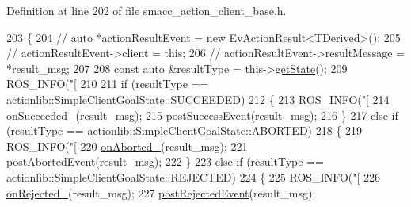 Definition at line 202 of file smacc\+\_\+action\+\_\+client\+\_\+base.\+h.


\begin{DoxyCode}
203     \{
204         \textcolor{comment}{// auto *actionResultEvent = new EvActionResult<TDerived>();}
205         \textcolor{comment}{// actionResultEvent->client = this;}
206         \textcolor{comment}{// actionResultEvent->resultMessage = *result\_msg;}
207 
208         \textcolor{keyword}{const} \textcolor{keyword}{auto} &resultType = this->\hyperlink{classsmacc_1_1client__bases_1_1SmaccActionClientBase_a97192acd7bb7cac5de0191e700ab72ee}{getState}();
209         ROS\_INFO(\textcolor{stringliteral}{"[%
210 
211         \textcolor{keywordflow}{if} (resultType == actionlib::SimpleClientGoalState::SUCCEEDED)
212         \{
213             ROS\_INFO(\textcolor{stringliteral}{"[%
214             \hyperlink{classsmacc_1_1client__bases_1_1SmaccActionClientBase_afa1d615e16c9e825d815a3a3ccaa61df}{onSucceeded\_}(result\_msg);
215             \hyperlink{classsmacc_1_1client__bases_1_1SmaccActionClientBase_afb4f82508cd653d496392f321e84a783}{postSuccessEvent}(result\_msg);
216         \}
217         \textcolor{keywordflow}{else} \textcolor{keywordflow}{if} (resultType == actionlib::SimpleClientGoalState::ABORTED)
218         \{
219             ROS\_INFO(\textcolor{stringliteral}{"[%
220             \hyperlink{classsmacc_1_1client__bases_1_1SmaccActionClientBase_adc33748ca4fcef9730f8039b75d496d0}{onAborted\_}(result\_msg);
221             \hyperlink{classsmacc_1_1client__bases_1_1SmaccActionClientBase_a9ca2952ededeec233ee6d8a9a39c680b}{postAbortedEvent}(result\_msg);
222         \}
223         \textcolor{keywordflow}{else} \textcolor{keywordflow}{if} (resultType == actionlib::SimpleClientGoalState::REJECTED)
224         \{
225             ROS\_INFO(\textcolor{stringliteral}{"[%
226             \hyperlink{classsmacc_1_1client__bases_1_1SmaccActionClientBase_a4c878cbf2684701323e2b36668f7d721}{onRejected\_}(result\_msg);
227             \hyperlink{classsmacc_1_1client__bases_1_1SmaccActionClientBase_a04cb60c48127e5534c1ce7045fb5abdc}{postRejectedEvent}(result\_msg);
}}}}
\end{DoxyCode}
